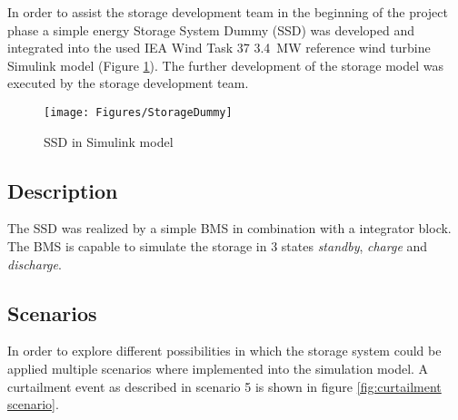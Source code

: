 In order to assist the storage development team in the beginning of the project phase a simple energy Storage System Dummy (SSD) was developed and integrated into the used IEA Wind Task 37 \SI{3.4}{MW} \cite{IEA} reference wind turbine Simulink model (Figure \ref{fig:Storage dummy}).
The further development of the storage model was executed by the storage development team.

\begin{figure}[h]
	\centering	
	\texttt{[image: Figures/StorageDummy]}
	\caption{SSD in Simulink model}
	\label{fig:Storage dummy}
\end{figure} 

\subsection*{Description}
The \gls{SSD} was realized by a simple \gls{BMS} in combination with a integrator block.
The \gls{BMS} is capable to simulate the storage in 3 states \textit{standby}, \textit{charge} and \textit{discharge}.

\subsection*{Scenarios}
In order to explore different possibilities in which the storage system could be applied multiple scenarios where implemented into the simulation model.
A curtailment event as described in scenario 5 is shown in figure \ref{fig:curtailment scenario}.

